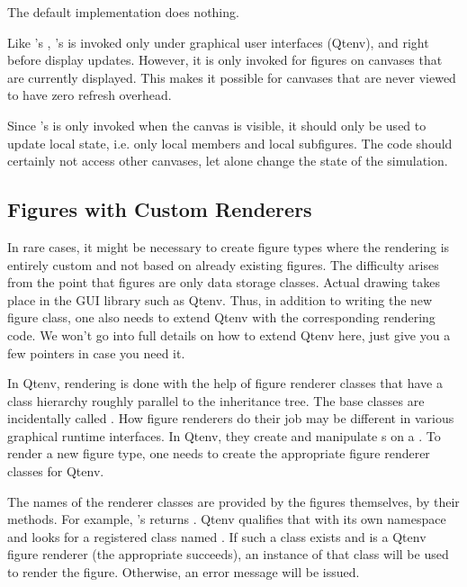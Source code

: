 The default implementation does nothing.

Like 's , 's
 is invoked only under graphical user interfaces
(Qtenv), and right before display updates. However, it is only invoked for
figures on canvases that are currently displayed. This makes it possible for
canvases that are never viewed to have zero refresh overhead.

Since 's  is only invoked when the
canvas is visible, it should only be used to update local state, i.e. only
local members and local subfigures. The code should certainly not access
other canvases, let alone change the state of the simulation.


\subsection{Figures with Custom Renderers}
\label{sec:graphics:figures-with-custom-renderers}

In rare cases, it might be necessary to create figure types where the rendering
is entirely custom and not based on already existing figures. The
difficulty arises from the point that figures are only data storage classes.
Actual drawing takes place in the GUI library such as Qtenv.
Thus, in addition to writing the new figure class, one also needs to extend
Qtenv with the corresponding rendering code.
We won't go into full details on how to extend Qtenv here, just give
you a few pointers in case you need it.

In Qtenv, rendering is done with the help of figure renderer
classes that have a class hierarchy roughly parallel to the
 inheritance tree. The base classes are incidentally called
. How figure renderers do their job may be different in
various graphical runtime interfaces. In Qtenv, they create and manipulate
s on a . To render a
new figure type, one needs to create the appropriate figure renderer
classes for Qtenv.

The names of the renderer classes are provided by the figures themselves,
by their  methods. For example,
's  returns
. Qtenv qualifies that with its own namespace and
looks for a registered class named
. If such a class exists and is a
Qtenv figure renderer (the appropriate  succeeds), an
instance of that class will be used to render the figure. Otherwise, an
error message will be issued.


